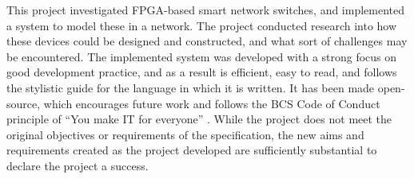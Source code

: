 


This project investigated FPGA-based smart network switches, and implemented a system to model these in a network.
The project conducted research into how these devices could be designed and constructed, and what sort of challenges may be encountered.
The implemented system was developed with a strong focus on good development practice, and as a result is efficient, easy to read, and follows the stylistic guide for the language in which it is written.
It has been made open-source, which encourages future work and follows the BCS Code of Conduct principle of ``You make IT for everyone'' \cite{bcs_code_of_conduct}.
While the project does not meet the original objectives or requirements of the specification, the new aims and requirements created as the project developed are sufficiently substantial to declare the project a success.
